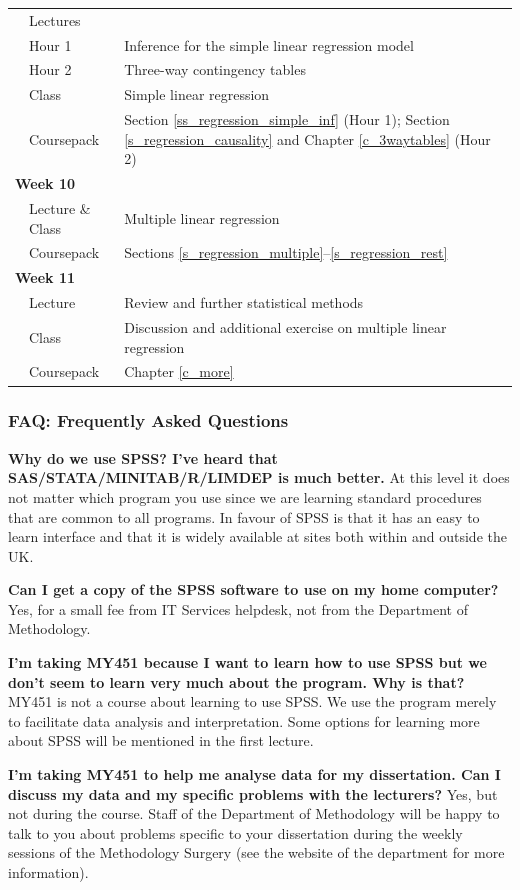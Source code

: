 \begin{tabular}{lll}
& Lectures  & \\
& \hspace*{1em}Hour 1  &
Inference for the simple linear regression model \\
& \hspace*{1em}Hour 2  &
Three-way contingency tables \\
& Class & Simple linear regression \\
& Coursepack & Section \ref{ss_regression_simple_inf}
(Hour 1); Section \ref{s_regression_causality} and
Chapter \ref{c_3waytables} (Hour 2) \\[3ex]
\multicolumn{2}{l}{\textbf{Week 10}} & \\
& Lecture \& Class & Multiple linear regression \\
& Coursepack & Sections \ref{s_regression_multiple}--\ref{s_regression_rest}
\\[3ex]
\multicolumn{2}{l}{\textbf{Week 11}} & \\
& Lecture & Review and further statistical methods\\
& Class & Discussion and additional exercise on multiple linear regression \\
& Coursepack & Chapter \ref{c_more}
\end{tabular}

\newpage
\subsubsection{FAQ: Frequently Asked Questions}

\textbf{Why do we use SPSS? I've heard that SAS/STATA/MINITAB/R/LIMDEP is
much better.} At this level it does not matter which program you use since
we are learning standard procedures that are common to all programs. In
favour of SPSS is that it has an easy to learn interface and
that it is widely available at sites both within and outside the UK.

\textbf{Can I get a copy of the SPSS software to use on my home computer?}
Yes,
for a small fee from IT Services helpdesk, not from the Department of Methodology.

\textbf{I'm taking MY451 because I want to learn how to use SPSS but we don't
seem to learn very much about the program. Why is that?} MY451 is not a
course about learning to use SPSS. We use the program merely to
facilitate data analysis and interpretation.
Some options for learning  more
about SPSS will be mentioned in the first lecture.

\textbf{I'm taking MY451 to help me analyse data for my dissertation. Can I
discuss my data and my specific problems with the lecturers?} Yes, but
not during the course.
Staff of the Department of Methodology
will be happy to talk to you about
problems specific to your dissertation during the weekly sessions of the
Methodology Surgery (see the website of the department for more information).

